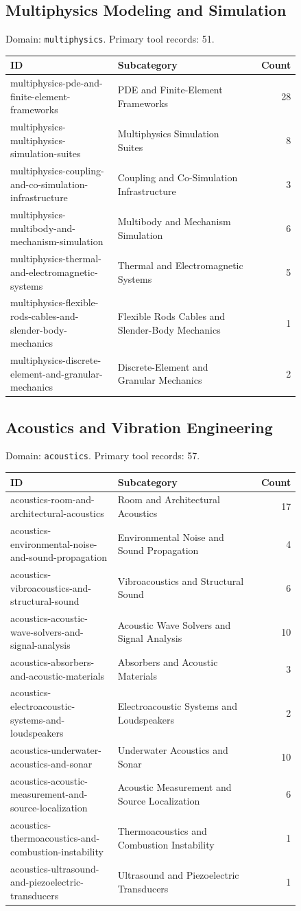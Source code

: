 \subsection{Multiphysics Modeling and Simulation}
\noindent Domain: \texttt{multiphysics}. Primary tool records: 51.
\begin{longtable}{p{0.37\linewidth}p{0.47\linewidth}r}
ID & Subcategory & Count\\\hline\endhead
multiphysics-pde-and-finite-element-frameworks & PDE and Finite-Element Frameworks & 28\\
multiphysics-multiphysics-simulation-suites & Multiphysics Simulation Suites & 8\\
multiphysics-coupling-and-co-simulation-infrastructure & Coupling and Co-Simulation Infrastructure & 3\\
multiphysics-multibody-and-mechanism-simulation & Multibody and Mechanism Simulation & 6\\
multiphysics-thermal-and-electromagnetic-systems & Thermal and Electromagnetic Systems & 5\\
multiphysics-flexible-rods-cables-and-slender-body-mechanics & Flexible Rods Cables and Slender-Body Mechanics & 1\\
multiphysics-discrete-element-and-granular-mechanics & Discrete-Element and Granular Mechanics & 2\\
\end{longtable}
\subsection{Acoustics and Vibration Engineering}
\noindent Domain: \texttt{acoustics}. Primary tool records: 57.
\begin{longtable}{p{0.37\linewidth}p{0.47\linewidth}r}
ID & Subcategory & Count\\\hline\endhead
acoustics-room-and-architectural-acoustics & Room and Architectural Acoustics & 17\\
acoustics-environmental-noise-and-sound-propagation & Environmental Noise and Sound Propagation & 4\\
acoustics-vibroacoustics-and-structural-sound & Vibroacoustics and Structural Sound & 6\\
acoustics-acoustic-wave-solvers-and-signal-analysis & Acoustic Wave Solvers and Signal Analysis & 10\\
acoustics-absorbers-and-acoustic-materials & Absorbers and Acoustic Materials & 3\\
acoustics-electroacoustic-systems-and-loudspeakers & Electroacoustic Systems and Loudspeakers & 2\\
acoustics-underwater-acoustics-and-sonar & Underwater Acoustics and Sonar & 10\\
acoustics-acoustic-measurement-and-source-localization & Acoustic Measurement and Source Localization & 6\\
acoustics-thermoacoustics-and-combustion-instability & Thermoacoustics and Combustion Instability & 1\\
acoustics-ultrasound-and-piezoelectric-transducers & Ultrasound and Piezoelectric Transducers & 1\\
\end{longtable}
